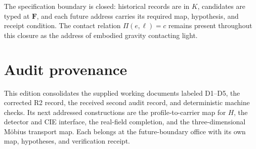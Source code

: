 \documentclass[10pt]{article}
\theoremstyle{remark}
\begin{document}
The specification boundary is closed: historical records are in $K$,
candidates are typed at $\mathbf F$, and each future address carries its
required map, hypothesis, and receipt condition.  The contact relation
\(\Pi(e,\ell)=c\) remains present throughout this closure as the address of
embodied gravity contacting light.

\section*{Audit provenance}

This edition consolidates the supplied working documents labeled D1--D5, the
corrected R2 record, the received second audit record, and deterministic
machine checks.  Its next addressed constructions are the profile-to-carrier
map for $H$, the detector and CIE interface, the real-field completion, and
the three-dimensional M\"obius transport map.  Each belongs at the
future-boundary office with its own map, hypotheses, and verification receipt.
\end{document}
